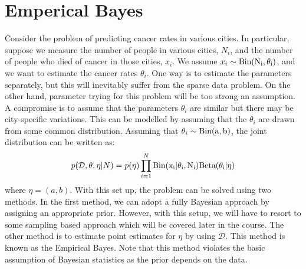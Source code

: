 \documentclass{article}
\begin{document}
\section{Emperical Bayes}
Consider the problem of predicting cancer rates in various cities. In particular, suppose we measure the number of people in various cities, $N_{i}$, and the number of people who died of cancer in those cities, $x_{i}$. We assume $x_{i} \sim \rm Bin(N_{i}, \theta_{i})$, and we want to estimate the cancer rates $\theta_{i}$. One way is to estimate the parameters separately, but this will inevitably suffer from the sparse data problem. On the other hand, parameter trying for this problem will be too strong an assumption. A compromise is to assume that the parameters $\theta_{i}$ are similar but there may be city-specific variations. This can be modelled by assuming that the $\theta_{i}$ are drawn from some common distribution. Assuming that $\theta_{i} \sim \rm Bin(a, b)$, the joint distribution can be written as:
\begin{equation}
    p(\mathcal{D},\theta,\eta|N) = p(\eta) \prod_{i=1}^{N} \rm Bin(x_{i}|\theta_{i},N_{i}) Beta(\theta_{i}|\eta)
\end{equation}
where $\eta = (a,b)$. With this set up, the problem can be solved using two methods. In the first method, we can adopt a fully Bayesian approach by assigning an appropriate prior. However, with this setup, we will have to resort to some sampling based approach which will be covered later in the course. The other method is to estimate point estimates for $\eta$ by using $\mathcal{D}$. This method is known as the Empirical Bayes. Note that this method violates the basic assumption of Bayesian statistics as the prior depends on the data.
\end{document}

